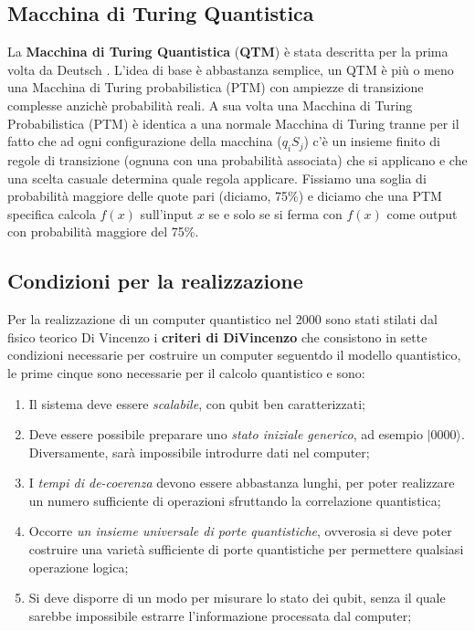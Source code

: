 \subsection{Macchina di Turing Quantistica}
La \textbf{Macchina di Turing Quantistica} (\textbf{QTM}) è stata descritta per la prima volta da Deutsch \cite{deutsch1985quantum}. L'idea di base è abbastanza semplice, un QTM è più o meno una Macchina di Turing probabilistica (PTM) con ampiezze di transizione complesse anzichè probabilità reali. A sua volta una Macchina di Turing Probabilistica (PTM) è identica a una normale Macchina di Turing tranne per il fatto che ad ogni configurazione della macchina (\(q_{i}S_{j}\)) c'è un insieme finito di regole di transizione (ognuna con una probabilità associata) che si applicano e che una scelta casuale determina quale regola applicare. Fissiamo una soglia di probabilità maggiore delle quote pari (diciamo, 75\%) e diciamo che una PTM specifica calcola \(f(x)\) sull'input \(x\) se e solo se si ferma con \(f(x)\) come output con probabilità maggiore del 75\%.

\subsection{Condizioni per la realizzazione}
Per la realizzazione di un computer quantistico nel 2000 sono stati stilati dal fisico teorico Di Vincenzo i \textbf{criteri di DiVincenzo} \cite{DiVincenzo_2000} che consistono in sette condizioni necessarie per costruire un computer seguentdo il modello quantistico, le prime cinque sono necessarie per il calcolo quantistico e sono:

\begin{enumerate}
  \item Il sistema deve essere \textit{scalabile}, con qubit ben caratterizzati;
  \item Deve essere possibile preparare uno \textit{stato iniziale generico}, ad esempio \(| 0000 \rangle \). Diversamente, sarà impossibile introdurre dati nel computer;
  \item I \textit{tempi di de-coerenza} devono essere abbastanza lunghi, per poter realizzare un numero sufficiente di operazioni sfruttando la correlazione quantistica;
  \item Occorre \textit{un insieme universale di porte quantistiche}, ovverosia si deve poter costruire una varietà sufficiente di porte quantistiche per permettere qualsiasi operazione logica;
  \item Si deve disporre di un modo per misurare lo stato dei qubit, senza il quale sarebbe impossibile estrarre l'informazione processata dal computer;
\end{enumerate}

